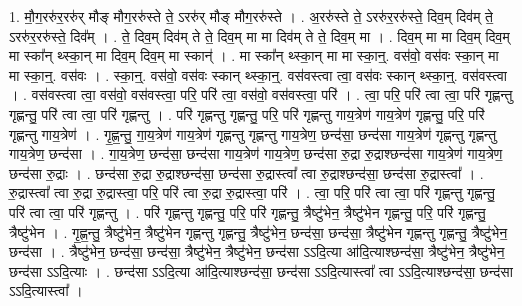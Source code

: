 \documentclass[17pt]{extarticle}
\begin{document}
1. मौ॒ग॒ररु॑र॒ररु॑र् मौङ् मौग॒ररु॑स्ते ते॒ ऽररु॑र् मौङ् मौग॒ररु॑स्ते । . अ॒ररु॑स्ते ते॒ ऽररु॑र॒ररु॑स्ते॒ दिव॒म् दिव॑म् ते॒ ऽररु॑र॒ररु॑स्ते॒ दिव᳚म् । . ते॒ दिव॒म् दिव॑म् ते ते॒ दिव॒म् मा मा दिव॑म् ते ते॒ दिव॒म् मा । . दिव॒म् मा मा दिव॒म् दिव॒म् मा स्का᳚न् थ्स्का॒न् मा दिव॒म् दिव॒म् मा स्कान्॑ । . मा स्का᳚न् थ्स्का॒न् मा मा स्का॒न्॒. वस॑वो॒ वस॑वः स्का॒न् मा मा स्का॒न्॒. वस॑वः । . स्का॒न्॒. वस॑वो॒ वस॑वः स्कान् थ्स्का॒न्॒. वस॑वस्त्वा त्वा॒ वस॑वः स्कान् थ्स्का॒न्॒. वस॑वस्त्वा । . वस॑वस्त्वा त्वा॒ वस॑वो॒ वस॑वस्त्वा॒ परि॒ परि॑ त्वा॒ वस॑वो॒ वस॑वस्त्वा॒ परि॑ । . त्वा॒ परि॒ परि॑ त्वा त्वा॒ परि॑ गृह्णन्तु गृह्णन्तु॒ परि॑ त्वा त्वा॒ परि॑ गृह्णन्तु । . परि॑ गृह्णन्तु गृह्णन्तु॒ परि॒ परि॑ गृह्णन्तु गाय॒त्रेण॑ गाय॒त्रेण॑ गृह्णन्तु॒ परि॒ परि॑ गृह्णन्तु गाय॒त्रेण॑ । . गृ॒ह्ण॒न्तु॒ गा॒य॒त्रेण॑ गाय॒त्रेण॑ गृह्णन्तु गृह्णन्तु गाय॒त्रेण॒ छन्द॑सा॒ छन्द॑सा गाय॒त्रेण॑ गृह्णन्तु गृह्णन्तु गाय॒त्रेण॒ छन्द॑सा । . गा॒य॒त्रेण॒ छन्द॑सा॒ छन्द॑सा गाय॒त्रेण॑ गाय॒त्रेण॒ छन्द॑सा रु॒द्रा रु॒द्राश्छन्द॑सा गाय॒त्रेण॑ गाय॒त्रेण॒ छन्द॑सा रु॒द्राः । . छन्द॑सा रु॒द्रा रु॒द्राश्छन्द॑सा॒ छन्द॑सा रु॒द्रास्त्वा᳚ त्वा रु॒द्राश्छन्द॑सा॒ छन्द॑सा रु॒द्रास्त्वा᳚ । . रु॒द्रास्त्वा᳚ त्वा रु॒द्रा रु॒द्रास्त्वा॒ परि॒ परि॑ त्वा रु॒द्रा रु॒द्रास्त्वा॒ परि॑ । . त्वा॒ परि॒ परि॑ त्वा त्वा॒ परि॑ गृह्णन्तु गृह्णन्तु॒ परि॑ त्वा त्वा॒ परि॑ गृह्णन्तु । . परि॑ गृह्णन्तु गृह्णन्तु॒ परि॒ परि॑ गृह्णन्तु॒ त्रैष्टु॑भेन॒ त्रैष्टु॑भेन गृह्णन्तु॒ परि॒ परि॑ गृह्णन्तु॒ त्रैष्टु॑भेन । . गृ॒ह्ण॒न्तु॒ त्रैष्टु॑भेन॒ त्रैष्टु॑भेन गृह्णन्तु गृह्णन्तु॒ त्रैष्टु॑भेन॒ छन्द॑सा॒ छन्द॑सा॒ त्रैष्टु॑भेन गृह्णन्तु गृह्णन्तु॒ त्रैष्टु॑भेन॒ छन्द॑सा । . त्रैष्टु॑भेन॒ छन्द॑सा॒ छन्द॑सा॒ त्रैष्टु॑भेन॒ त्रैष्टु॑भेन॒ छन्द॑सा ऽऽदि॒त्या आ॑दि॒त्याश्छन्द॑सा॒ त्रैष्टु॑भेन॒ त्रैष्टु॑भेन॒ छन्द॑सा ऽऽदि॒त्याः । . छन्द॑सा ऽऽदि॒त्या आ॑दि॒त्याश्छन्द॑सा॒ छन्द॑सा ऽऽदि॒त्यास्त्वा᳚ त्वा ऽऽदि॒त्याश्छन्द॑सा॒ छन्द॑सा ऽऽदि॒त्यास्त्वा᳚ । \newline
\end{document}
